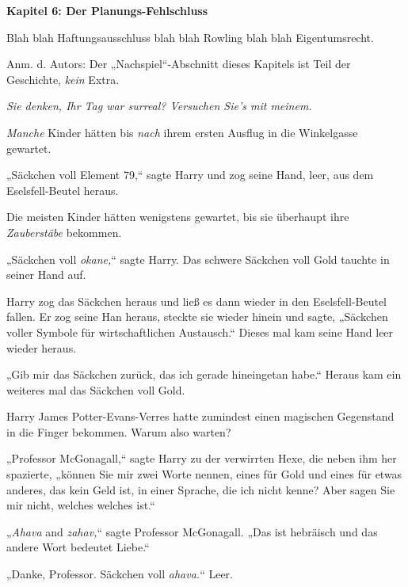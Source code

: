 

\hypertarget{der-planungs-fehlschluss}{%

\textbf{Kapitel 6: Der Planungs-Fehlschluss}

Blah blah Haftungsausschluss blah blah Rowling blah blah Eigentumsrecht.

Anm. d. Autors: Der „Nachspiel“-Abschnitt dieses Kapitels ist Teil der Geschichte, \emph{kein} Extra.

\later

\emph{Sie denken, Ihr Tag war surreal? Versuchen Sie's mit meinem.}

\later

\emph{Manche} Kinder hätten bis \emph{nach} ihrem ersten Ausflug in die Winkelgasse gewartet.

„Säckchen voll Element 79,“ sagte Harry und zog seine Hand, leer, aus dem Eselsfell-Beutel heraus.

Die meisten Kinder hätten wenigstens gewartet, bis sie überhaupt ihre \emph{Zauberstäbe} bekommen.

„Säckchen voll \emph{okane,}“ sagte Harry. Das schwere Säckchen voll Gold tauchte in seiner Hand auf.

Harry zog das Säckchen heraus und ließ es dann wieder in den Eselsfell-Beutel fallen. Er zog seine Han heraus, steckte sie wieder hinein und sagte, „Säckchen voller Symbole für wirtschaftlichen Austausch.“ Dieses mal kam seine Hand leer wieder heraus.

„Gib mir das Säckchen zurück, das ich gerade hineingetan habe.“ Heraus kam ein weiteres mal das Säckchen voll Gold.

Harry James Potter-Evans-Verres hatte zumindest einen magischen Gegenstand in die Finger bekommen. Warum also warten?

„Professor McGonagall,“ sagte Harry zu der verwirrten Hexe, die neben ihm her spazierte, „können Sie mir zwei Worte nennen, eines für Gold und eines für etwas anderes, das kein Geld ist, in einer Sprache, die ich nicht kenne? Aber sagen Sie mir nicht, welches welches ist.“

„\emph{Ahava} and \emph{zahav,}“ sagte Professor McGonagall. „Das ist hebräisch und das andere Wort bedeutet Liebe.“

„Danke, Professor. Säckchen voll \emph{ahava.}“ Leer.

}
